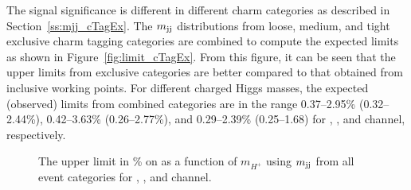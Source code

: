 The signal significance is different in different charm categories as described in 
Section~\ref{ss:mjj_cTagEx}. The $m_\text{jj}$ distributions from loose, medium, and tight 
exclusive charm tagging categories are combined to compute the expected limits as shown in 
Figure~\ref{fig:limit_cTagEx}. From this figure, it can be seen that the upper limits
from exclusive categories are better compared to that obtained from inclusive working points.
For different charged Higgs masses, the expected (observed) limits from combined categories are 
in the range 0.37--2.95\% (0.32--2.44\%), 0.42--3.63\% (0.26--2.77\%), 
and 0.29--2.39\% (0.25--1.68) for \mujets, \ejets, and \ljets channel, 
respectively.

\begin{figure}
    \centering  
    \vfil
    \caption{The upper limit in \% on \brThb as a function of $m_{H^{+}}$ using $m_\text{jj}$ from 
	all event categories for \mujets, \ejets, and \ljets channel.}
\label{fig:finalLimit}
\end{figure}

